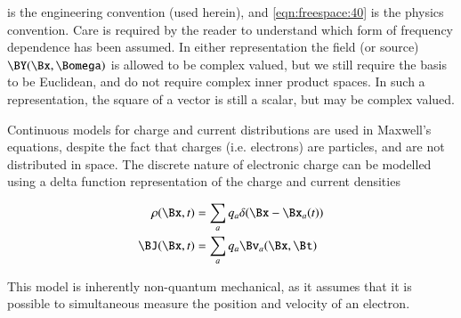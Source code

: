  is the engineering convention (used herein), and \cref{eqn:freespace:40} is the physics convention.
Care is required by the reader to understand which form of frequency dependence has been assumed.
In either representation the field (or source) \( \BY(\Bx, \Bomega) \) is allowed to be complex valued, but we still require the basis to be Euclidean, and do not require complex inner product spaces.  In such a representation, the square of a vector is still a scalar, but may be complex valued.

Continuous models for charge and current distributions are used in Maxwell's equations, despite the
fact that charges (i.e. electrons) are particles, and are not distributed in space.
The discrete nature of electronic charge can be modelled using a delta function representation of the charge and current densities

\begin{dmath}\label{eqn:freespace:240}
\begin{aligned}
\rho(\Bx, t) &= \sum_a q_a \delta( \Bx - \Bx_a( t) ) \\
\BJ(\Bx, t) &= \sum_a q_a \Bv_a( \Bx, \Bt )
\end{aligned}
\end{dmath}

This model is inherently non-quantum mechanical, as it assumes that it is possible to
simultaneous measure the position and velocity of an electron.

